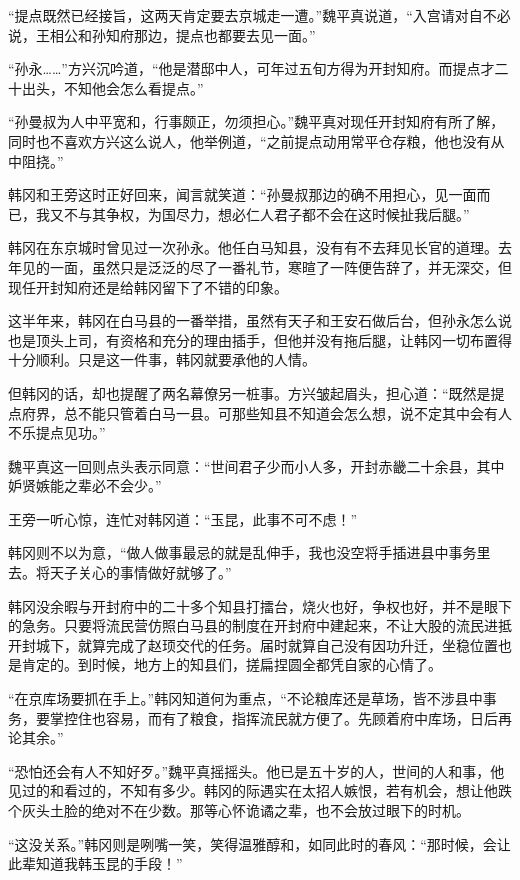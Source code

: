 “提点既然已经接旨，这两天肯定要去京城走一遭。”魏平真说道，“入宫请对自不必说，王相公和孙知府那边，提点也都要去见一面。”

“孙永……”方兴沉吟道，“他是潜邸中人，可年过五旬方得为开封知府。而提点才二十出头，不知他会怎么看提点。”

“孙曼叔为人中平宽和，行事颇正，勿须担心。”魏平真对现任开封知府有所了解，同时也不喜欢方兴这么说人，他举例道，“之前提点动用常平仓存粮，他也没有从中阻挠。”

韩冈和王旁这时正好回来，闻言就笑道：“孙曼叔那边的确不用担心，见一面而已，我又不与其争权，为国尽力，想必仁人君子都不会在这时候扯我后腿。”

韩冈在东京城时曾见过一次孙永。他任白马知县，没有有不去拜见长官的道理。去年见的一面，虽然只是泛泛的尽了一番礼节，寒暄了一阵便告辞了，并无深交，但现任开封知府还是给韩冈留下了不错的印象。

这半年来，韩冈在白马县的一番举措，虽然有天子和王安石做后台，但孙永怎么说也是顶头上司，有资格和充分的理由插手，但他并没有拖后腿，让韩冈一切布置得十分顺利。只是这一件事，韩冈就要承他的人情。

但韩冈的话，却也提醒了两名幕僚另一桩事。方兴皱起眉头，担心道：“既然是提点府界，总不能只管着白马一县。可那些知县不知道会怎么想，说不定其中会有人不乐提点见功。”

魏平真这一回则点头表示同意：“世间君子少而小人多，开封赤畿二十余县，其中妒贤嫉能之辈必不会少。”

王旁一听心惊，连忙对韩冈道：“玉昆，此事不可不虑！”

韩冈则不以为意，“做人做事最忌的就是乱伸手，我也没空将手插进县中事务里去。将天子关心的事情做好就够了。”

韩冈没余暇与开封府中的二十多个知县打擂台，烧火也好，争权也好，并不是眼下的急务。只要将流民营仿照白马县的制度在开封府中建起来，不让大股的流民进抵开封城下，就算完成了赵顼交代的任务。届时就算自己没有因功升迁，坐稳位置也是肯定的。到时候，地方上的知县们，搓扁捏圆全都凭自家的心情了。

“在京库场要抓在手上。”韩冈知道何为重点，“不论粮库还是草场，皆不涉县中事务，要掌控住也容易，而有了粮食，指挥流民就方便了。先顾着府中库场，日后再论其余。”

“恐怕还会有人不知好歹。”魏平真摇摇头。他已是五十岁的人，世间的人和事，他见过的和看过的，不知有多少。韩冈的际遇实在太招人嫉恨，若有机会，想让他跌个灰头土脸的绝对不在少数。那等心怀诡谲之辈，也不会放过眼下的时机。

“这没关系。”韩冈则是咧嘴一笑，笑得温雅醇和，如同此时的春风：“那时候，会让此辈知道我韩玉昆的手段！”

